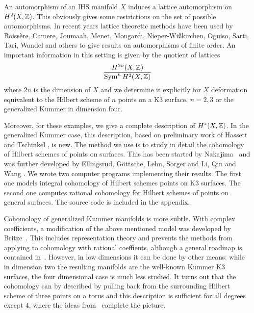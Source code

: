 An automorphism of an IHS manifold $X$ induces a lattice automorphism on $H^2(X,\mathbb{Z})$. This obviously gives some restrictions on the set of possible automorphisms.
In recent years lattice theoretic methods have been used by
Boiss\`ere, Camere, Joumaah, Menet, Mongardi, Nieper-Wi\ss kirchen, Oguiso, Sarti, Tari, Wandel and others to give results on
automorphisms of finite order. 
An important information in this setting is given by the quotient of lattices
$$
\frac{H^{2n}(X,\mathbb{Z})}{\operatorname{Sym}^n H^2(X,\mathbb{Z})}
$$
where $2n$ is the dimension of $X$ and we determine it explicitly for $X$ deformation equivalent to the Hilbert scheme of $n$ points on a K3 surface, $n=2,3$ or the generalized Kummer in dimension four. 

Moreover, for these examples, we give a complete description of $H^*(X,\mathbb{Z})$. In the generalized Kummer case, this description, based on preliminary work of Hassett and Tschinkel \cite{Hassett}, is new. 
The method we use is to study in detail the cohomology of Hilbert schemes of points on surfaces. This has been started by Nakajima~\cite{Nakajima} and was further developed by Ellingsrud, G\"ottsche, Lehn, Sorger \cite{EGL,LehnSorger} and Li, Qin and Wang \cite{LiQinWang,LiQinWang2,QinWang}.
We wrote two computer programs implementing their results. The first one models integral cohomology of Hilbert schemes points on K3 surfaces. The second one computes rational cohomology for Hilbert schemes of points on general surfaces. The source code is included in the appendix. 

Cohomology of generalized Kummer manifolds is more subtle. With complex coefficients, a modification of the above mentioned model was developed by Britze~\cite{Britze}. This includes representation theory and prevents the methods from applying to cohomology with rational coeffients, although a general roadmap is contained in~\cite{Twisted}.
However, in low dimensions it can be done by other means: while in dimension two the resulting manifolds are the well-known Kummer K3 surfaces, the four dimensional case is much less studied. It turns out that the cohomology can by described by pulling back from the surrounding Hilbert scheme of three points on a torus and this description is sufficient for all degrees except $4$, where the ideas from~\cite{Hassett} complete the picture.

